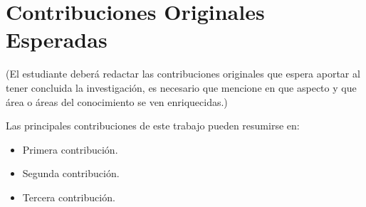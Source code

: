 \chapter{Contribuciones Originales Esperadas}
(El estudiante deberá redactar las contribuciones originales que espera aportar al tener concluida la investigación, es necesario que mencione en que aspecto y que área o áreas del conocimiento se ven enriquecidas.)

Las principales contribuciones de este trabajo pueden resumirse en:

 \begin{itemize}
 	
	\item Primera contribución.
	
	\item Segunda contribución.
	
	\item Tercera contribución. 	
	
 \end{itemize}
